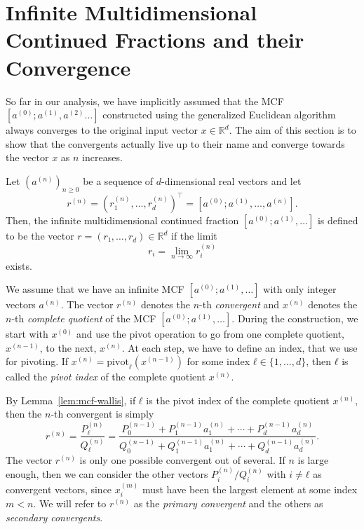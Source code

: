 \section{Infinite Multidimensional Continued Fractions and their Convergence}
\label{sec:mcf-convergence}

So far in our analysis, we have implicitly assumed that the MCF $[a^{(0)}; a^{(1)}, a^{(2)} …]$
constructed using the generalized Euclidean algorithm always converges to the
original input vector $x ∈ ℝ^d$.
The aim of this section is to show that the convergents actually live up to
their name and converge towards the vector $x$ as $n$ increases.

\begin{definition}
  Let $(a^{(n)})_{n ≥ 0}$ be a sequence of $d$-dimensional real vectors
  and let
  \[
    r^{(n)} = (r_1^{(n)}, …, r_d^{(n)})^⊤ = [a^{(0)}; a^{(1)}, …, a^{(n)}].
  \]
  Then, the infinite multidimensional continued fraction $[a^{(0)}; a^{(1)}, …]$ is defined to be
  the vector $r = (r₁, …, r_d) ∈ ℝ^d$ if the limit
  \[
    r_i = \lim_{n → ∞} r_i^{(n)}
  \]
  exists.
\end{definition}

We assume that we have an infinite MCF $[a^{(0)}; a^{(1)}, …]$
with only integer vectors $a^{(n)}$.
The vector $r^{(n)}$ denotes the $n$-th \emph{convergent}
and $x^{(n)}$ denotes the $n$-th \emph{complete quotient} of the MCF $[a^{(0)}; a^{(1)}, …]$.
During the construction, we start with $x^{(0)}$ and use the pivot operation to
go from one complete quotient, $x^{(n-1)}$, to the next, $x^{(n)}$.
At each step, we have to define an index, that we use for pivoting.
If $x^{(n)} = \mathrm{pivot}_ℓ(x^{(n-1)})$ for some index $ℓ ∈ \{1, …, d\}$,
then $ℓ$ is called the \emph{pivot index} of the complete quotient $x^{(n)}$.

By Lemma~\ref{lem:mcf-wallis},
if $ℓ$ is the pivot index of the complete quotient $x^{(n)}$,
then the $n$-th convergent is simply
\[
  r^{(n)}
  = \frac{P_ℓ^{(n)}}{Q_ℓ^{(n)}}
  = \frac{P_0^{(n-1)} + P_1^{(n-1)} a_1^{(n)} + ⋯ + P_d^{(n-1)} a_d^{(n)}}{Q_0^{(n-1)} + Q_1^{(n-1)} a_1^{(n)} + ⋯ + Q_d^{(n-1)} a_d^{(n)}}.
\]
The vector $r^{(n)}$ is only one possible convergent out of several.
If $n$ is large enough, then we can consider the other vectors
$P_i^{(n)}/Q_i^{(n)}$ with $i ≠ ℓ$ as convergent vectors,
since $x_i^{(m)}$ must have been the largest element at some index $m < n$.
We will refer to $r^{(n)}$ as the \emph{primary convergent} and the others as
\emph{secondary convergents}.

